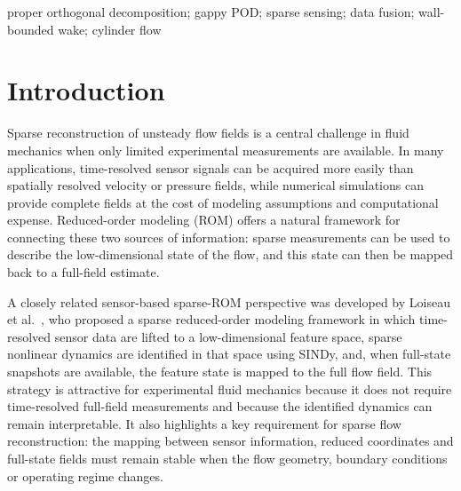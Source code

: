 \documentclass[preprint,12pt]{elsarticle}
\begin{document}
\begin{frontmatter}
\begin{keyword} 
proper orthogonal decomposition; gappy POD; sparse sensing; data fusion; wall-bounded wake; cylinder flow



\end{keyword}

\end{frontmatter}



\section{Introduction}
\label{sec1}

Sparse reconstruction of unsteady flow fields is a central challenge in fluid mechanics when only limited experimental measurements are available. In many applications, time-resolved sensor signals can be acquired more easily than spatially resolved velocity or pressure fields, while numerical simulations can provide complete fields at the cost of modeling assumptions and computational expense. Reduced-order modeling (ROM) offers a natural framework for connecting these two sources of information: sparse measurements can be used to describe the low-dimensional state of the flow, and this state can then be mapped back to a full-field estimate.

A closely related sensor-based sparse-ROM perspective was developed by Loiseau et al.~\citep{Loiseau2017}, who proposed a sparse reduced-order modeling framework in which time-resolved sensor data are lifted to a low-dimensional feature space, sparse nonlinear dynamics are identified in that space using SINDy, and, when full-state snapshots are available, the feature state is mapped to the full flow field. This strategy is attractive for experimental fluid mechanics because it does not require time-resolved full-field measurements and because the identified dynamics can remain interpretable. It also highlights a key requirement for sparse flow reconstruction: the mapping between sensor information, reduced coordinates and full-state fields must remain stable when the flow geometry, boundary conditions or operating regime changes.
\end{document}

